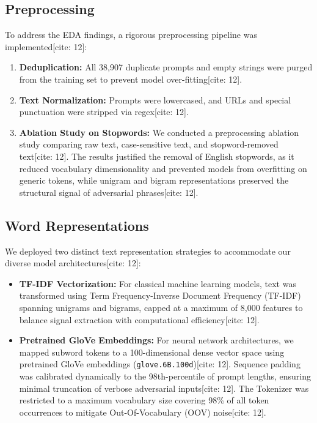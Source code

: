 \documentclass[11pt]{article}
\begin{document}
\subsection{Preprocessing}
To address the EDA findings, a rigorous preprocessing pipeline was implemented[cite: 12]:
\begin{enumerate}
    \item \textbf{Deduplication:} All 38,907 duplicate prompts and empty strings were purged from the training set to prevent model over-fitting[cite: 12].
    \item \textbf{Text Normalization:} Prompts were lowercased, and URLs and special punctuation were stripped via regex[cite: 12].
    \item \textbf{Ablation Study on Stopwords:} We conducted a preprocessing ablation study comparing raw text, case-sensitive text, and stopword-removed text[cite: 12]. The results justified the removal of English stopwords, as it reduced vocabulary dimensionality and prevented models from overfitting on generic tokens, while unigram and bigram representations preserved the structural signal of adversarial phrases[cite: 12].
\end{enumerate}

\subsection{Word Representations}
We deployed two distinct text representation strategies to accommodate our diverse model architectures[cite: 12]:
\begin{itemize}
    \item \textbf{TF-IDF Vectorization:} For classical machine learning models, text was transformed using Term Frequency-Inverse Document Frequency (TF-IDF) spanning unigrams and bigrams, capped at a maximum of 8,000 features to balance signal extraction with computational efficiency[cite: 12].
    \item \textbf{Pretrained GloVe Embeddings:} For neural network architectures, we mapped subword tokens to a 100-dimensional dense vector space using pretrained GloVe embeddings (\texttt{glove.6B.100d})[cite: 12]. Sequence padding was calibrated dynamically to the 98th-percentile of prompt lengths, ensuring minimal truncation of verbose adversarial inputs[cite: 12]. The Tokenizer was restricted to a maximum vocabulary size covering 98\% of all token occurrences to mitigate Out-Of-Vocabulary (OOV) noise[cite: 12].
\end{itemize}
\end{document}
